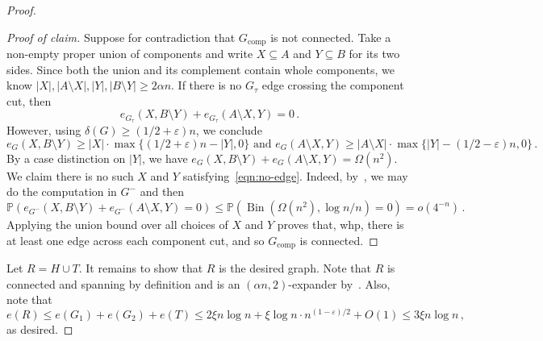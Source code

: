 \documentclass[reqno,final,a4paper]{amsart}
\numberwithin{equation}{section}
\theoremstyle{definition}
\theoremstyle{remark}
\renewcommand{\Pr}{\mathbb{P}}
\newcommand{\eps}{\varepsilon}
\newcommand{\Bin}{\operatorname{Bin}}
\newenvironment{proofclaim}[1][Proof of claim]{\begin{proof}[#1]\renewcommand*{\qedsymbol}{\(\blacksquare\)}}{\end{proof}}
\begin{document}
\begin{proof}
\begin{proofclaim}
        Suppose for contradiction that $G_{\mathrm{comp}}$ is not connected. Take a non-empty proper union of components and write $X\subseteq A$ and $Y\subseteq B$ for its two sides. 
        Since both the union and its complement contain whole components, we know $|X|, |A\setminus X|, |Y|, |B\setminus Y|\geq 2\alpha n$. If there is no $G_\tau$ edge crossing the component cut, then 
        \begin{equation}\label{eqn:no-edge}
            e_{G_\tau}(X, B\setminus Y) + e_{G_\tau}(A\setminus X, Y) = 0\,.
        \end{equation}
        However, using $\delta(G) \geq (1/2 + \eps)n$, we conclude 
        \[
            e_G(X,B\setminus Y) \geq |X|\cdot \max\{(1/2+\eps)n - |Y|, 0\} \text{ and } e_G(A\setminus X, Y) \geq |A\setminus X|\cdot \max\{|Y| - (1/2-\eps)n, 0\}\,.
        \]
        By a case distinction on $|Y|$, we have $e_G(X,B\setminus Y) + e_G(A\setminus X, Y)= \Omega(n^2)$. 
        We claim there is no such $X$ and $Y$ satisfying~\eqref{eqn:no-edge}. Indeed, by~, we may do the computation in $G^-$ and then
        \[
            \Pr(e_{G^-}(X, B\setminus Y) + e_{G^-}(A\setminus X, Y) = 0)\leq \Pr(\Bin(\Omega(n^2), \log n/n) = 0) = o(4^{-n})\,.
        \]
        Applying the union bound over all choices of $X$ and $Y$ proves that, whp, there is at least one edge across each component cut, and so $G_{\mathrm{comp}}$ is connected.
    \end{proofclaim}    
  Let $R = H\cup T$. It remains to show that $R$ is the desired graph. Note that $R$ is connected and spanning by definition and is an $(\alpha n,2)$-expander by~.
  Also, note that 
  $$e(R)\leq e(G_1) + e(G_2) + e(T) \leq 2\xi n\log n + \xi \log n\cdot n^{(1-\eps)/2} + O(1)\leq 3\xi n\log n\,,$$
  as desired.
\end{proof}
\end{document}
